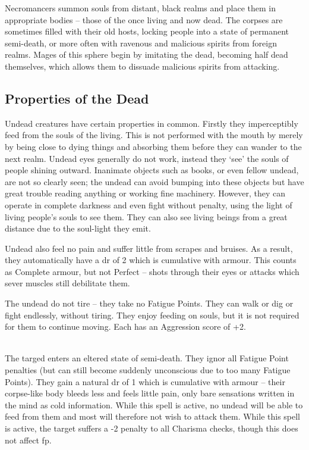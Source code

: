 \documentclass[titlepage,a4paper,openany]{book}
\begin{document}
\begin{multicols}{2}

Necromancers summon souls from distant, black realms and place them in appropriate bodies -- those of the once living and now dead. The corpses are sometimes filled with their old hosts, locking people into a state of permanent semi-death, or more often with ravenous and malicious spirits from foreign realms. Mages of this sphere begin by imitating the dead, becoming half dead themselves, which allows them to dissuade malicious spirits from attacking.

\subsection{Properties of the Dead}

Undead creatures have certain properties in common. Firstly they imperceptibly feed from the souls of the living. This is not performed with the mouth by merely by being close to dying things and absorbing them before they can wander to the next realm. Undead eyes generally do not work, instead they `see' the souls of people shining outward. Inanimate objects such as books, or even fellow undead, are not so clearly seen; the undead can avoid bumping into these objects but have great trouble reading anything or working fine machinery. However, they can operate in complete darkness and even fight without penalty, using the light of living people's souls to see them. They can also see living beings from a great distance due to the soul-light they emit.

Undead also feel no pain and suffer little from scrapes and bruises. As a result, they automatically have a \gls{dr} of 2 which is cumulative with armour. This counts as Complete armour, but not Perfect -- shots through their eyes or attacks which sever muscles still debilitate them.

The undead do not tire -- they take no Fatigue Points. They can walk or dig or fight endlessly, without tiring. They enjoy feeding on souls, but it is not required for them to continue moving. Each has an Aggression score of +2.

\spelllevel

\\
The targed enters an eltered state of semi-death. They ignor all Fatigue Point penalties (but can still become suddenly unconscious due to too many Fatigue Points). They gain a natural \gls{dr} of 1 which is cumulative with armour -- their corpse-like body bleeds less and feels little pain, only bare sensations written in the mind as cold information. While this spell is active, no undead will be able to feed from them and most will therefore not wish to attack them. While this spell is active, the target suffers a -2 penalty to all Charisma checks, though this does not affect \gls{fp}.


\end{multicols}
\end{document}
